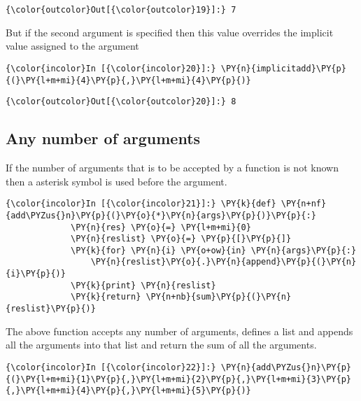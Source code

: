             \begin{Verbatim}[commandchars=\\\{\}]
{\color{outcolor}Out[{\color{outcolor}19}]:} 7
\end{Verbatim}
        
    But if the second argument is specified then this value overrides the
implicit value assigned to the argument

    \begin{Verbatim}[commandchars=\\\{\}]
{\color{incolor}In [{\color{incolor}20}]:} \PY{n}{implicitadd}\PY{p}{(}\PY{l+m+mi}{4}\PY{p}{,}\PY{l+m+mi}{4}\PY{p}{)}
\end{Verbatim}

            \begin{Verbatim}[commandchars=\\\{\}]
{\color{outcolor}Out[{\color{outcolor}20}]:} 8
\end{Verbatim}
        
    \subsection{Any number of arguments}\label{any-number-of-arguments}

    If the number of arguments that is to be accepted by a function is not
known then a asterisk symbol is used before the argument.

    \begin{Verbatim}[commandchars=\\\{\}]
{\color{incolor}In [{\color{incolor}21}]:} \PY{k}{def} \PY{n+nf}{add\PYZus{}n}\PY{p}{(}\PY{o}{*}\PY{n}{args}\PY{p}{)}\PY{p}{:}
             \PY{n}{res} \PY{o}{=} \PY{l+m+mi}{0}
             \PY{n}{reslist} \PY{o}{=} \PY{p}{[}\PY{p}{]}
             \PY{k}{for} \PY{n}{i} \PY{o+ow}{in} \PY{n}{args}\PY{p}{:}
                 \PY{n}{reslist}\PY{o}{.}\PY{n}{append}\PY{p}{(}\PY{n}{i}\PY{p}{)}
             \PY{k}{print} \PY{n}{reslist}
             \PY{k}{return} \PY{n+nb}{sum}\PY{p}{(}\PY{n}{reslist}\PY{p}{)}
\end{Verbatim}

    The above function accepts any number of arguments, defines a list and
appends all the arguments into that list and return the sum of all the
arguments.

    \begin{Verbatim}[commandchars=\\\{\}]
{\color{incolor}In [{\color{incolor}22}]:} \PY{n}{add\PYZus{}n}\PY{p}{(}\PY{l+m+mi}{1}\PY{p}{,}\PY{l+m+mi}{2}\PY{p}{,}\PY{l+m+mi}{3}\PY{p}{,}\PY{l+m+mi}{4}\PY{p}{,}\PY{l+m+mi}{5}\PY{p}{)}
\end{Verbatim}

